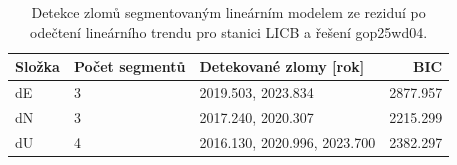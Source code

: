 \begin{table}[htbp]
\caption{Detekce zlomů segmentovaným lineárním modelem ze reziduí po odečtení lineárního trendu pro stanici LICB a řešení gop25wd04.}
\label{tab:gop25wd04_stcd_licb_detr_weighted_1seg_jumps_piecewise_bic}
\begin{tabular}{lllr}
\toprule
Složka & Počet segmentů & Detekované zlomy [rok] & BIC \\
\midrule
dE & 3 & 2019.503, 2023.834 & 2877.957 \\
dN & 3 & 2017.240, 2020.307 & 2215.299 \\
dU & 4 & 2016.130, 2020.996, 2023.700 & 2382.297 \\
\bottomrule
\end{tabular}
\end{table}

